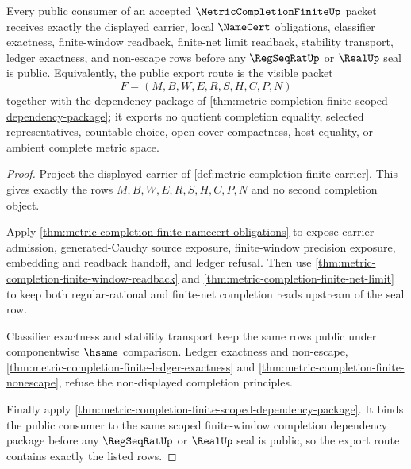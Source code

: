 \begin{theorem}
\label{thm:metric-completion-finite-public-export-route}
Every public consumer of an accepted $\MetricCompletionFiniteUp$ packet receives exactly the displayed carrier, local $\NameCert$ obligations, classifier exactness, finite-window readback, finite-net limit readback, stability transport, ledger exactness, and non-escape rows before any $\RegSeqRatUp$ or $\RealUp$ seal is public. Equivalently, the public export route is the visible packet
$$
F=(M,B,W,E,R,S,H,C,P,N)
$$
together with the dependency package of \autoref{thm:metric-completion-finite-scoped-dependency-package}; it exports no quotient completion equality, selected representatives, countable choice, open-cover compactness, host equality, or ambient complete metric space.
\end{theorem}
\begin{proof}
Project the displayed carrier of \autoref{def:metric-completion-finite-carrier}. This gives exactly the rows $M,B,W,E,R,S,H,C,P,N$ and no second completion object.

Apply \autoref{thm:metric-completion-finite-namecert-obligations} to expose carrier admission, generated-Cauchy source exposure, finite-window precision exposure, embedding and readback handoff, and ledger refusal. Then use \autoref{thm:metric-completion-finite-window-readback} and \autoref{thm:metric-completion-finite-net-limit} to keep both regular-rational and finite-net completion reads upstream of the seal row.

Classifier exactness and stability transport keep the same rows public under componentwise $\hsame$ comparison. Ledger exactness and non-escape, \autoref{thm:metric-completion-finite-ledger-exactness} and \autoref{thm:metric-completion-finite-nonescape}, refuse the non-displayed completion principles.

Finally apply \autoref{thm:metric-completion-finite-scoped-dependency-package}. It binds the public consumer to the same scoped finite-window completion dependency package before any $\RegSeqRatUp$ or $\RealUp$ seal is public, so the export route contains exactly the listed rows.
\end{proof}

